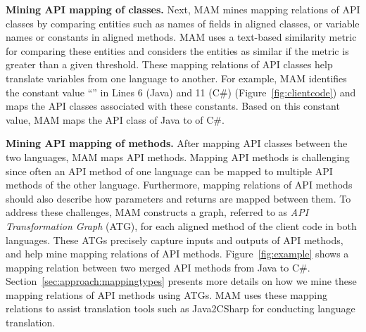 \textbf{Mining API mapping of classes.} Next, MAM mines mapping
relations of API classes by comparing entities such as names of
fields in aligned classes, or variable names or constants in aligned
methods. MAM uses a text-based similarity metric for comparing these
entities and considers the entities as similar if the metric is
greater than a given threshold. These mapping relations of API
classes help translate variables from one language to another. For
example, MAM identifies the constant value ``'' in
Lines 6 (Java) and 11 (C\#) (Figure~\ref{fig:clientcode}) and maps
the API classes associated with these constants. Based on this
constant value, MAM maps the API class  of Java
to  of C\#.

\textbf{Mining API mapping of methods.} After mapping API classes
between the two languages, MAM maps API methods. Mapping API methods
is challenging since often an API method of one language can be
mapped to multiple API methods of the other language. Furthermore,
mapping relations of API methods should also describe how parameters
and returns are mapped between them. To address these challenges,
MAM constructs a graph, referred to as \emph{API Transformation
Graph} (ATG), for each aligned method of the client code in both
languages. These ATGs precisely capture inputs and outputs of API
methods, and help mine mapping relations of API methods.
Figure~\ref{fig:example} shows a mapping relation between two merged
API methods from Java to C\#.
Section~\ref{sec:approach:mappingtypes} presents more details on how
we mine these mapping relations of API methods using ATGs. MAM uses
these mapping relations to assist translation tools such as
Java2CSharp for conducting language translation.

